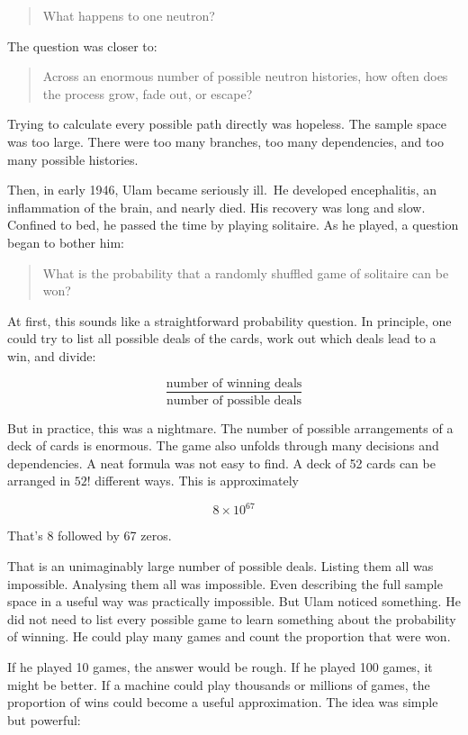 \documentclass[
  letterpaper,
  DIV=11,
  numbers=noendperiod]{scrreprt}
\begin{document}
\begin{quote}
What happens to one neutron?
\end{quote}

The question was closer to:

\begin{quote}
Across an enormous number of possible neutron histories, how often does
the process grow, fade out, or escape?
\end{quote}

Trying to calculate every possible path directly was hopeless. The
sample space was too large. There were too many branches, too many
dependencies, and too many possible histories.

Then, in early 1946, Ulam became seriously ill.~He developed
encephalitis, an inflammation of the brain, and nearly died. His
recovery was long and slow. Confined to bed, he passed the time by
playing solitaire. As he played, a question began to bother him:

\begin{quote}
What is the probability that a randomly shuffled game of solitaire can
be won?
\end{quote}

At first, this sounds like a straightforward probability question. In
principle, one could try to list all possible deals of the cards, work
out which deals lead to a win, and divide:

\[\frac{\text{number of winning deals}}{\text{number of possible deals}}\]

But in practice, this was a nightmare. The number of possible
arrangements of a deck of cards is enormous. The game also unfolds
through many decisions and dependencies. A neat formula was not easy to
find. A deck of 52 cards can be arranged in \(52!\) different ways. This
is approximately

\[8 \times10^{67}\]

That's 8 followed by 67 zeros.

That is an unimaginably large number of possible deals. Listing them all
was impossible. Analysing them all was impossible. Even describing the
full sample space in a useful way was practically impossible. But Ulam
noticed something. He did not need to list every possible game to learn
something about the probability of winning. He could play many games and
count the proportion that were won.

If he played 10 games, the answer would be rough. If he played 100
games, it might be better. If a machine could play thousands or millions
of games, the proportion of wins could become a useful approximation.
The idea was simple but powerful:
\end{document}
